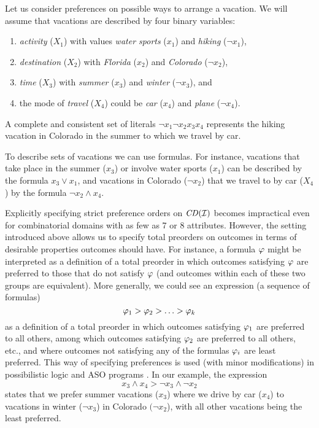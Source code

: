 Let us consider preferences on possible ways to
arrange a vacation. We will assume that vacations are described by 
four binary variables: 
\begin{enumerate}  %
\item \textit{activity} ($X_1$) with values \textit{water sports} ($x_1$) and 
\textit{hiking} ($\neg x_1$),
\item \textit{destination} ($X_2$) with \textit{Florida} ($x_2$) and 
\textit{Colorado} ($\neg x_2$),
\item \textit{time} ($X_3$) with \textit{summer} ($x_3$) and 
\textit{winter} ($\neg x_3$), and
\item the mode of \textit{travel} ($X_4$) could be \textit{car} ($x_4$)
and \textit{plane} ($\neg x_4$).
\end{enumerate}
A complete and consistent set of literals $\neg x_1\neg x_2x_3x_4$
represents the hiking vacation in Colorado in the summer to which we travel
by car. 

To describe sets of vacations we can use formulas. For instance, 
vacations that take place in the summer ($x_3$) or involve water sports
($x_1$) can be described by the formula $x_3 \vee x_1$, and vacations 
in Colorado ($\neg x_2$) that we travel to by car ($X_4$) by the formula $\neg x_2
\wedge x_4$.

Explicitly specifying strict preference orders on $\mathit{CD}(\mathcal{I})$ becomes 
impractical even for combinatorial domains with as few as 7 or 8 attributes. 
However, 
the setting introduced above allows us to specify total preorders on
outcomes in terms of desirable properties outcomes should have. For 
instance, a formula $\mathit{\varphi}$ might be interpreted as a definition of
a total preorder in which outcomes satisfying $\mathit{\varphi}$ are preferred to
those that do not satisfy $\mathit{\varphi}$ (and outcomes within each of these
two groups are equivalent). More generally, we could see an expression
(a sequence of formulas)
\[
\mathit{\varphi}_1> \mathit{\varphi}_2>\ldots>\mathit{\varphi}_k
\]
as a definition of a total preorder in which outcomes satisfying $\mathit{\varphi}_1$
are preferred to all others, among which outcomes satisfying $\mathit{\varphi}_2$ are
preferred to all others, etc., and where outcomes not satisfying any of the 
formulas $\mathit{\varphi}_i$ are least preferred. This way of specifying preferences 
is used
(with minor modifications) in possibilistic logic \cite{DuboisLP91} and 
ASO programs \cite{Brewka:ASO}.
In our example, the expression
\[
x_3 \land x_4 > \neg x_3 \land \neg x_2 
\]
states that we prefer summer vacations ($x_3$) where we drive by car ($x_4$)
to vacations in winter ($\neg x_3$) in Colorado $(\neg x_2$), with all 
other vacations being the least preferred.

